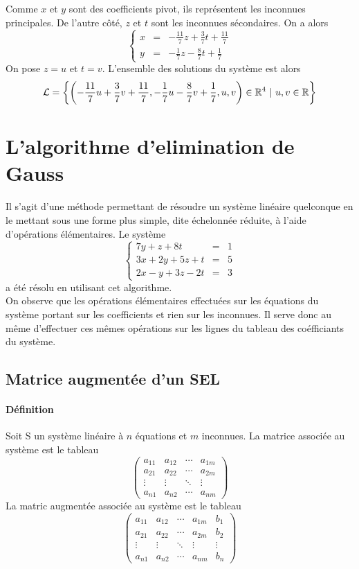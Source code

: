Comme $x$ et $y$ sont des coefficients pivot, ils représentent les inconnues principales. De l'autre côté, $z$ et $t$ sont les inconnues sécondaires. On a alors
$$\left\{ \begin{array}{rcl}
  x & = & -\frac{11}{7} z + \frac{3}{7} t + \frac{11}{7} \\
  y & = & -\frac{1}{7} z - \frac{8}{7} t + \frac{1}{7}
\end{array} \right.$$
On pose $z=u$ et $t=v$. L'ensemble des solutions du système est alors
$$\mathcal{L} = \left\{ \left(-\frac{11}{7} u + \frac{3}{7} v + \frac{11}{7}, -\frac{1}{7} u - \frac{8}{7} v + \frac{1}{7}, u, v \right) \in \mathbb{R}^4 ~ \vert ~ u, v \in \mathbb{R} \right\}$$
%
%
\section{L'algorithme d'elimination de Gauss}
%
%
Il s'agit d'une méthode permettant de résoudre un système linéaire quelconque en le mettant sous une forme plus simple, dite échelonnée réduite, à l'aide d'opérations élémentaires. Le système
$$\left\{\begin{array}{rcl}
  7 y + z + 8 t & = & 1 \\
  3 x + 2 y + 5 z + t & = & 5 \\
  2 x - y + 3 z - 2 t & = & 3
\end{array} \right.$$
a été résolu en utilisant cet algorithme. \\
On observe que les opérations élémentaires effectuées sur les équations du système portant sur les coefficients et rien sur les inconnues. Il serve donc au même d'effectuer ces mêmes opérations sur les lignes du tableau des coéfficiants du système.

%
\subsection{Matrice augmentée d'un SEL}
%
\paragraph{Définition} Soit S un système linéaire à $n$ équations et $m$ inconnues. La matrice associée au système est le tableau
$$\begin{pmatrix}
  a_{11} & a_{12} & \cdots & a_{1m} \\
  a_{21} & a_{22} & \cdots & a_{2m} \\
  \vdots  & \vdots  & \ddots & \vdots  \\
  a_{n1} & a_{n2} & \cdots & a_{nm}
 \end{pmatrix}$$
La matric augmentée associée au système est le tableau
$$\left( \begin{array}{cccc|c}
  a_{11} & a_{12} & \cdots & a_{1m} & b_{1} \\
  a_{21} & a_{22} & \cdots & a_{2m} & b_{2} \\
  \vdots  & \vdots  & \ddots & \vdots & \vdots  \\
  a_{n1} & a_{n2} & \cdots & a_{nm} & b_{n}
 \end{array} \right) $$
 
